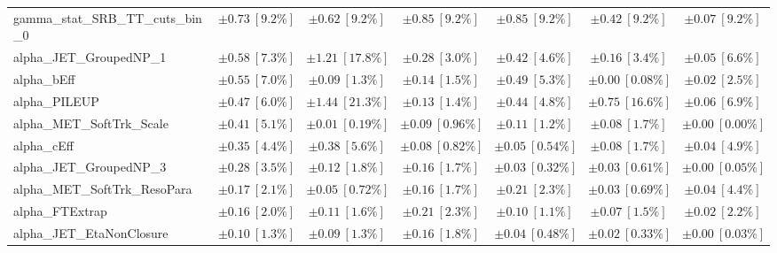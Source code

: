 \begin{sidewaystable}
\begin{center}
\begin{tabular*}{\textwidth}{@{\extracolsep{\fill}}lcccccc}
gamma\_stat\_SRB\_TT\_cuts\_bin\_0         & $\pm 0.73\ [9.2\%] $          & $\pm 0.62\ [9.2\%] $          & $\pm 0.85\ [9.2\%] $          & $\pm 0.85\ [9.2\%] $          & $\pm 0.42\ [9.2\%] $          & $\pm 0.07\ [9.2\%] $       \\
alpha\_JET\_GroupedNP\_1         & $\pm 0.58\ [7.3\%] $          & $\pm 1.21\ [17.8\%] $          & $\pm 0.28\ [3.0\%] $          & $\pm 0.42\ [4.6\%] $          & $\pm 0.16\ [3.4\%] $          & $\pm 0.05\ [6.6\%] $       \\
alpha\_bEff         & $\pm 0.55\ [7.0\%] $          & $\pm 0.09\ [1.3\%] $          & $\pm 0.14\ [1.5\%] $          & $\pm 0.49\ [5.3\%] $          & $\pm 0.00\ [0.08\%] $          & $\pm 0.02\ [2.5\%] $       \\
alpha\_PILEUP         & $\pm 0.47\ [6.0\%] $          & $\pm 1.44\ [21.3\%] $          & $\pm 0.13\ [1.4\%] $          & $\pm 0.44\ [4.8\%] $          & $\pm 0.75\ [16.6\%] $          & $\pm 0.06\ [6.9\%] $       \\
alpha\_MET\_SoftTrk\_Scale         & $\pm 0.41\ [5.1\%] $          & $\pm 0.01\ [0.19\%] $          & $\pm 0.09\ [0.96\%] $          & $\pm 0.11\ [1.2\%] $          & $\pm 0.08\ [1.7\%] $          & $\pm 0.00\ [0.00\%] $       \\
alpha\_cEff         & $\pm 0.35\ [4.4\%] $          & $\pm 0.38\ [5.6\%] $          & $\pm 0.08\ [0.82\%] $          & $\pm 0.05\ [0.54\%] $          & $\pm 0.08\ [1.7\%] $          & $\pm 0.04\ [4.9\%] $       \\
alpha\_JET\_GroupedNP\_3         & $\pm 0.28\ [3.5\%] $          & $\pm 0.12\ [1.8\%] $          & $\pm 0.16\ [1.7\%] $          & $\pm 0.03\ [0.32\%] $          & $\pm 0.03\ [0.61\%] $          & $\pm 0.00\ [0.05\%] $       \\
alpha\_MET\_SoftTrk\_ResoPara         & $\pm 0.17\ [2.1\%] $          & $\pm 0.05\ [0.72\%] $          & $\pm 0.16\ [1.7\%] $          & $\pm 0.21\ [2.3\%] $          & $\pm 0.03\ [0.69\%] $          & $\pm 0.04\ [4.4\%] $       \\
alpha\_FTExtrap         & $\pm 0.16\ [2.0\%] $          & $\pm 0.11\ [1.6\%] $          & $\pm 0.21\ [2.3\%] $          & $\pm 0.10\ [1.1\%] $          & $\pm 0.07\ [1.5\%] $          & $\pm 0.02\ [2.2\%] $       \\
alpha\_JET\_EtaNonClosure         & $\pm 0.10\ [1.3\%] $          & $\pm 0.09\ [1.3\%] $          & $\pm 0.16\ [1.8\%] $          & $\pm 0.04\ [0.48\%] $          & $\pm 0.02\ [0.33\%] $          & $\pm 0.00\ [0.03\%] $       \\

\end{tabular*}
\end{center}
\end{sidewaystable}
